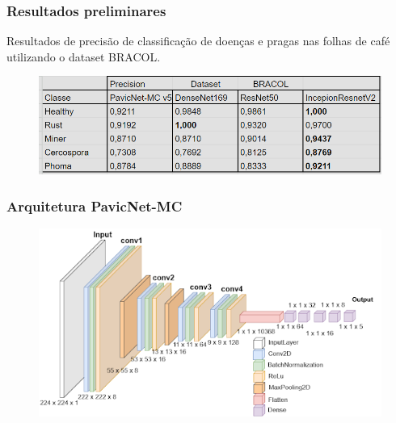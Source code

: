 \documentclass[aspectratio=169]{beamer}
\begin{document}
\begin{frame}
    \frametitle{Resultados preliminares}

    \centering
    Resultados de precisão de classificação de doenças e pragas nas folhas de café utilizando o dataset BRACOL.

    \begin{figure}
        \centering
        \includegraphics[scale = 0.7]{img/precision.png}
        \label{fig:enter-label}
    \end{figure}



\end{frame}









\begin{frame}
    \frametitle{Arquitetura PavicNet-MC}


    \begin{figure}
        \centering
        \includegraphics[scale=0.7]{img/pavicnet.png}
        \label{fig:enter-label}
    \end{figure}


\end{frame}
\end{document}

